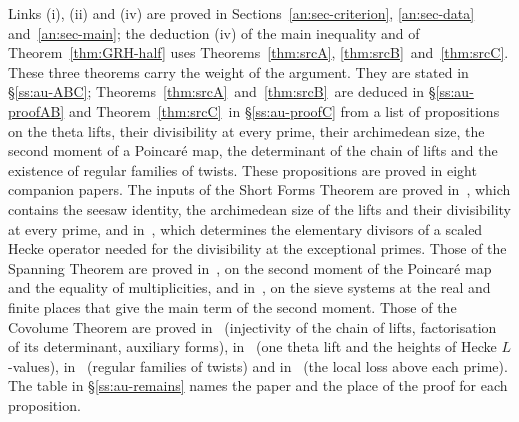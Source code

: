 \documentclass[10pt]{amsart}
\theoremstyle{definition}
\theoremstyle{remark}
\newcommand{\anThmA}{\ref{thm:srcA}}\newcommand{\anThmB}{\ref{thm:srcB}}\newcommand{\anThmC}{\ref{thm:srcC}}
\begin{document}
Links (i), (ii) and (iv) are proved in Sections~\ref{an:sec-criterion},
\ref{an:sec-data} and~\ref{an:sec-main}; the deduction (iv) of the main
inequality and of Theorem~\ref{thm:GRH-half} uses Theorems~\anThmA,
\anThmB\ and~\anThmC. These three theorems carry the weight of the argument.
They are stated in \S\ref{ss:au-ABC}; Theorems~\anThmA\ and~\anThmB\ are
deduced in \S\ref{ss:au-proofAB} and Theorem~\anThmC\ in \S\ref{ss:au-proofC}
from a list of propositions on the theta lifts, their divisibility at every
prime, their archimedean size, the second moment of a Poincar\'e map, the
determinant of the chain of lifts and the existence of regular families of
twists. These propositions are proved in eight companion papers. The inputs
of the Short Forms Theorem are proved in~\cite{P49}, which contains the seesaw
identity, the archimedean size of the lifts and their divisibility at every
prime, and in~\cite{P50}, which determines the elementary divisors of a scaled
Hecke operator needed for the divisibility at the exceptional primes. Those of
the Spanning Theorem are proved in~\cite{P51}, on the second moment of the
Poincar\'e map and the equality of multiplicities, and in~\cite{P52}, on the
sieve systems at the real and finite places that give the main term of the
second moment. Those of the Covolume Theorem are proved in~\cite{P53}
(injectivity of the chain of lifts, factorisation of its determinant,
auxiliary forms), in~\cite{P54} (one theta lift and the heights of Hecke
$L$-values), in~\cite{P55} (regular families of twists) and in~\cite{P56} (the
local loss above each prime). The table in \S\ref{ss:au-remains} names the
paper and the place of the proof for each proposition.
\end{document}

